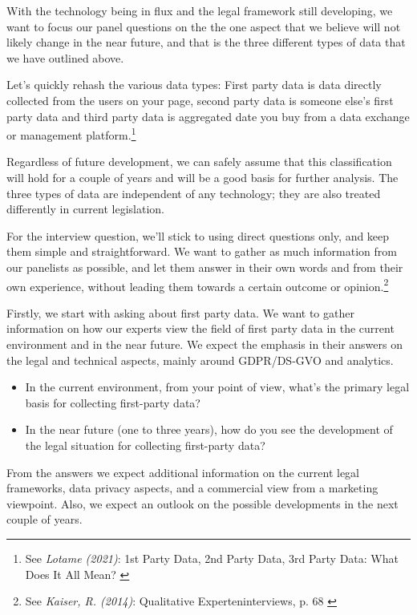 With the technology being in flux and the legal framework still developing, we want to focus our panel questions on the the one aspect that we believe will not likely change in the near future, and that is the three different types of data that we have outlined above.

Let's quickly rehash the various data types: First party data is data directly collected from the users on your page, second party data is someone else's first party data and third party data is aggregated date you buy from a data exchange or management platform.\footnote{See \textit{Lotame (2021)}: 1st Party Data, 2nd Party Data, 3rd Party Data: What Does It All Mean? \cite{lotameRehash}}

Regardless of future development, we can safely assume that this classification will hold for a couple of years and will be a good basis for further analysis. The three types of data are independent of any technology; they are also treated differently in current legislation.

For the interview question, we'll stick to using direct questions only, and keep them simple and straightforward. We want to gather as much information from our panelists as possible, and let them answer in their own words and from their own experience, without leading them towards a certain outcome or opinion.\footnote{See \textit{Kaiser, R. (2014)}: Qualitative Experteninterviews, p. 68 \cite{expertInterviews}} 

Firstly, we start with asking about first party data. We want to gather information on how our experts view the field of first party data in the current environment and in the near future. We expect the emphasis in their answers on the legal and technical aspects, mainly around GDPR/DS-GVO and analytics.

\begin{itemize}
 \item In the current environment, from your point of view, what's the primary legal basis for collecting first-party data?
 \item In the near future (one to three years), how do you see the development of the legal situation for collecting first-party data?
\end{itemize}
 
From the answers we expect additional information on the current legal frameworks, data privacy aspects, and a commercial view from a marketing viewpoint. Also, we expect an outlook on the possible developments in the next couple of years.
 
